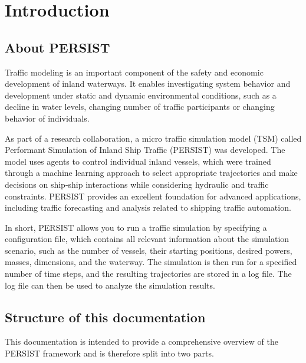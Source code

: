 \documentclass[
	a4paper, %
	12pt, %
]{persist}
\begin{document}
\newpage

\section{Introduction} 

\subsection{About PERSIST} %

Traffic modeling is an important component of the safety and economic development of inland waterways. It enables investigating system behavior and development under static and dynamic environmental conditions, such as a decline in water levels, changing number of traffic participants or changing behavior of individuals.

As part of a research collaboration, a micro traffic simulation model (TSM) called Performant Simulation of Inland Ship Traffic (PERSIST) was developed. The model uses agents to control individual inland vessels, which were trained through a machine learning approach to select appropriate trajectories and make decisions on ship-ship interactions while considering hydraulic and traffic constraints. PERSIST provides an excellent foundation for advanced applications, including traffic forecasting and analysis related to shipping traffic automation. 

In short, PERSIST allows you to run a traffic simulation by specifying a configuration file, which contains all relevant information about the simulation scenario, such as the number of vessels, their starting positions, desired powers, masses, dimensions, and the waterway. The simulation is then run for a specified number of time steps, and the resulting trajectories are stored in a log file. The log file can then be used to analyze the simulation results.

\subsection{Structure of this documentation} %

This documentation is intended to provide a comprehensive overview of the PERSIST framework and is therefore split into two parts. 
\end{document}
